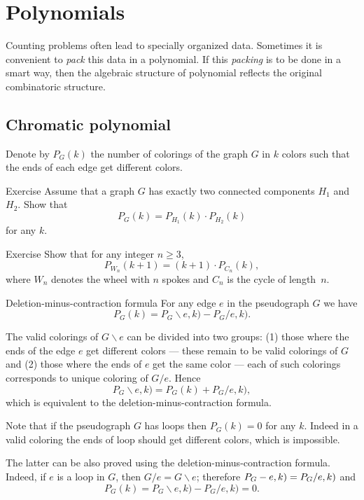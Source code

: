 \chapter{Polynomials}

Counting problems often lead to specially organized data.
Sometimes it is convenient to \emph{pack} this data in a polynomial.
If this \emph{packing} is to be done in a smart way, then the algebraic structure of polynomial reflects the original combinatoric structure.

\section*{Chromatic polynomial}

Denote by $P_G(k)$ the number of colorings of the graph $G$ in $k$ colors such that the ends of each edge get different colors.

\begin{thm}{Exercise}
Assume that a graph $G$ has exactly two connected components $H_1$ and $H_2$.
Show that 
\[P_G(k)=P_{H_1}(k)\cdot P_{H_2}(k)\]
for any $k$.
\end{thm}

\begin{thm}{Exercise}
Show that for any integer $n\ge 3$,
\[P_{W_n}(k+1)=(k+1)\cdot P_{C_n}(k),\]
where $W_n$ denotes the wheel with $n$ spokes and $C_n$ is the cycle of length~$n$.
\end{thm}

\begin{thm}{Deletion-minus-contraction formula}\label{thm:deletion-minus-contraction}
For any edge $e$ in the pseudograph $G$ we have
\[P_G(k)=P_G\backslash e,k)-P_G/e,k).\]
\end{thm}

The valid colorings of $G\backslash e$ can be divided into two groups: 
(1) those where the ends of the edge $e$ get different colors --- these remain to be valid colorings of $G$ and (2) those where the ends of $e$ get the same color --- each of such colorings corresponds to unique coloring of $G/e$.
Hence
\[P_G\backslash e,k)=P_G(k)+P_G/e,k),\]
which is equivalent to the deletion-minus-contraction formula.
\qeds

Note that if the pseudograph $G$ has loops then $P_G(k)=0$ for any $k$.
Indeed in a valid coloring the ends of loop should get different colors, which is impossible.

The latter can be also proved using the deletion-minus-contraction formula.
Indeed, if $e$ is a loop in $G$, then $G/e=G\backslash e$;
therefore $P_G\backslash e,k)\z=P_G/e,k)$ and
\[P_G(k)=P_G\backslash e,k)-P_G/e,k) =0.\]

